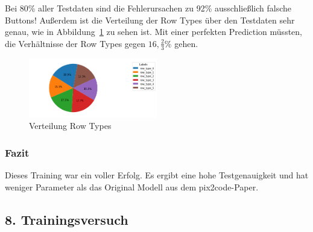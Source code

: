 \documentclass[pdftex,a4paper,halfparskip, article]{scrartcl}
\begin{document}
Bei 80\% aller Testdaten sind die Fehlerursachen zu 92\% ausschließlich falsche Buttons! Außerdem ist die Verteilung der Row Types über den Testdaten sehr genau, wie in Abbildung~\ref{fig:bin10_row_type} zu sehen ist. Mit einer perfekten Prediction müssten, die Verhältnisse der Row Types gegen $16,\frac{2}{3}\%$ gehen.

\begin{figure}[h]
\centering
\includegraphics[width=0.5\textwidth]{predictions_bin10_predicted_row_type_distribution}
\caption{Verteilung Row Types}
\label{fig:bin10_row_type}
\end{figure}


\subsubsection*{Fazit}

Dieses Training war ein voller Erfolg. Es ergibt eine hohe Testgenauigkeit und hat weniger Parameter als das Original Modell aus dem pix2code-Paper. 

\subsection{8. Trainingsversuch}
\end{document}
